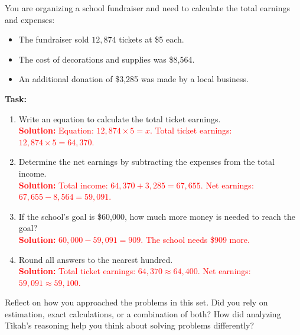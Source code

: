 \documentclass[12pt]{article}
\begin{document}
\vspace{1em}

\begin{tcolorbox}[colframe=black!60, colback=white, 
coltitle=black, colbacktitle=black!15, fonttitle=\bfseries\Large, 
title=Performance Task: Plan a School Fundraiser, halign title=center, left=10pt, right=10pt, top=10pt, bottom=50pt]
You are organizing a school fundraiser and need to calculate the total earnings and expenses:
\begin{itemize}
    \item The fundraiser sold \( 12,874 \) tickets at \$5 each.
    \item The cost of decorations and supplies was \$8,564.
    \item An additional donation of \$3,285 was made by a local business.
\end{itemize}
\textbf{Task:}
\begin{enumerate}[itemsep=3em]
    \item Write an equation to calculate the total ticket earnings.\\
    \textcolor{red}{\textbf{Solution:} Equation: \( 12,874 \times 5 = x \). Total ticket earnings: \( 12,874 \times 5 = 64,370 \).}

    \item Determine the net earnings by subtracting the expenses from the total income.\\
    \textcolor{red}{\textbf{Solution:} Total income: \( 64,370 + 3,285 = 67,655 \). Net earnings: \( 67,655 - 8,564 = 59,091 \).}

    \item If the school’s goal is \$60,000, how much more money is needed to reach the goal?\\
    \textcolor{red}{\textbf{Solution:} \( 60,000 - 59,091 = 909 \). The school needs \$909 more.}

    \item Round all answers to the nearest hundred.\\
    \textcolor{red}{\textbf{Solution:} Total ticket earnings: \( 64,370 \approx 64,400 \). Net earnings: \( 59,091 \approx 59,100 \).}
\end{enumerate}
\end{tcolorbox}

\begin{tcolorbox}[colframe=black!60, colback=white, 
coltitle=black, colbacktitle=black!15, fonttitle=\bfseries\Large, 
title=Reflection, halign title=center, left=10pt, right=10pt, top=10pt, bottom=120pt]
Reflect on how you approached the problems in this set. Did you rely on estimation, exact calculations, or a combination of both? How did analyzing Tikah's reasoning help you think about solving problems differently?
\end{tcolorbox}
\end{document}
